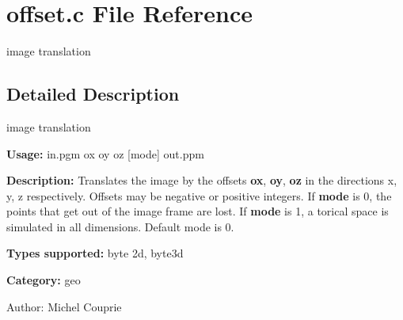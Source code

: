 \section{offset.c File Reference}
\label{offset_8c}
image translation  




\label{_details}
\subsection{Detailed Description}
image translation 

{\bf Usage:} in.pgm ox oy oz [mode] out.ppm

{\bf Description:} Translates the image by the offsets {\bf ox}, {\bf oy}, {\bf oz} in the directions x, y, z respectively. Offsets may be negative or positive integers. If {\bf mode} is 0, the points that get out of the image frame are lost. If {\bf mode} is 1, a torical space is simulated in all dimensions. Default mode is 0.

{\bf Types supported:} byte 2d, byte3d

{\bf Category:} geo

\begin{Desc}
\item[Author:]Michel Couprie \end{Desc}
